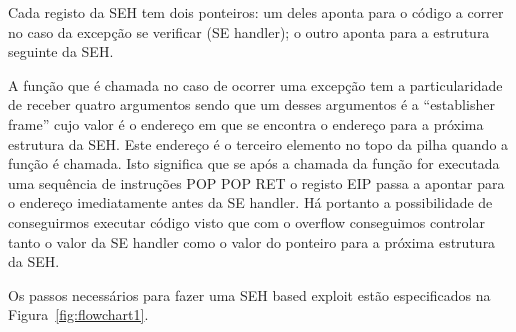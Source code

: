 \documentclass[a4paper]{article}
\begin{document}
Cada registo da SEH tem dois ponteiros: um deles aponta para o código a correr no caso da excepção se verificar (SE handler); o outro aponta para a estrutura seguinte da SEH.

A função que é chamada no caso de ocorrer uma excepção tem a particularidade de receber quatro argumentos sendo que um desses argumentos é a ``establisher frame'' cujo valor é o endereço em que se encontra o endereço para a próxima estrutura da SEH. Este endereço é o terceiro elemento no topo da pilha quando a função é chamada. Isto significa que se após a chamada da função for executada uma sequência de instruções POP POP RET o registo EIP passa a apontar para o endereço imediatamente antes da SE handler. Há portanto a possibilidade de conseguirmos executar código visto que com o overflow conseguimos controlar tanto o valor da SE handler como o valor do ponteiro para a próxima estrutura da SEH.

Os passos necessários para fazer uma SEH based exploit estão especificados na Figura~\ref{fig:flowchart1}.

\end{document}
